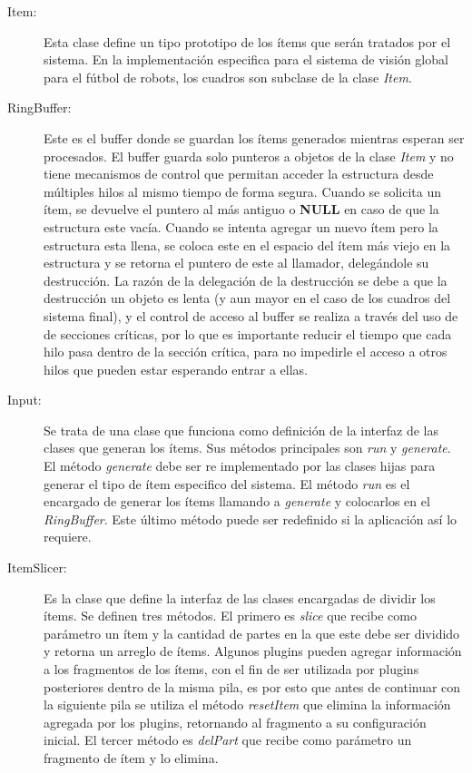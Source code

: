 \begin{description}

	\item[Item:] Esta clase define un tipo prototipo de los ítems que serán
		tratados por el sistema. En la implementación especifica para el
		sistema de visión global para el fútbol de robots, los cuadros
		son subclase de la clase \emph{Item}.

	\item[RingBuffer:] Este es el buffer donde se guardan los ítems
		generados mientras esperan ser procesados. El buffer guarda solo
		punteros a objetos de la clase \emph{Item} y no tiene mecanismos
		de control que permitan acceder la estructura desde múltiples
		hilos al mismo tiempo de forma segura. Cuando se solicita un
		ítem, se devuelve el puntero al más antiguo o \textbf{NULL} en
		caso de que la estructura este vacía. Cuando se intenta agregar
		un nuevo ítem pero la estructura esta llena, se coloca este en
		el espacio del ítem más viejo en la estructura y se retorna el
		puntero de este al llamador, delegándole su destrucción. La
		razón de la delegación de la destrucción se debe a que la
		destrucción un objeto es lenta (y aun mayor en el caso de los
		cuadros del sistema final), y el control de acceso al buffer se
		realiza a través del uso de de secciones críticas, por lo que es
		importante reducir el tiempo que cada hilo pasa dentro de la
		sección crítica, para no impedirle el acceso a otros hilos que
		pueden estar esperando entrar a ellas.

	\item[Input:] Se trata de una clase que funciona como definición de la
		interfaz de las clases que generan los ítems. Sus métodos
		principales son \emph{run} y \emph{generate}. El método
		\emph{generate} debe ser re implementado por las clases hijas
		para generar el tipo de ítem especifico del sistema. El método
		\emph{run} es el encargado de generar los ítems llamando a
		\emph{generate} y colocarlos en el \emph{RingBuffer}. Este
		último método puede ser redefinido si la aplicación así lo
		requiere.

	\item[ItemSlicer:] Es la clase que define la interfaz de las clases
		encargadas de dividir los ítems. Se definen tres métodos. El
		primero es \emph{slice} que recibe como parámetro un ítem y la
		cantidad de partes en la que este debe ser dividido y retorna un
		arreglo de ítems. Algunos plugins pueden agregar información a
		los fragmentos de los ítems, con el fin de ser utilizada por
		plugins posteriores dentro de la misma pila, es por esto que
		antes de continuar con la siguiente pila se utiliza el método
		\emph{resetItem} que elimina la información agregada por los
		plugins, retornando al fragmento a su configuración inicial. El
		tercer método es \emph{delPart} que recibe como parámetro un
		fragmento de ítem y lo elimina.


\end{description}
